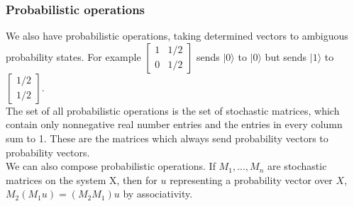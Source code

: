 \documentclass{amsart}
\begin{document}
\subsubsection*{Probabilistic operations}
We also have probabilistic operations, taking determined vectors to ambiguous probability
states. For example $ \begin{bmatrix} 1 & 1/2 \\ 0 & 1/2 \end{bmatrix} $ sends $ |0 \rangle $
to $ |0\rangle $ but sends $ |1 \rangle $ to $ \begin{bmatrix} 1/2 \\ 1/2 \end{bmatrix} $. \\
The set of all probabilistic operations is the set of stochastic matrices, which contain only
nonnegative real number entries and the entries in every column sum to 1. These are the
matrices which always send probability vectors to probability vectors. \\
We can also compose probabilistic operations. If $ M_1,...,M_n $ are stochastic matrices on
the system X, then for $ u $ representing a probability vector over $ X $,
$ M_2(M_1u) = (M_2M_1)u $ by associativity.
\end{document}
